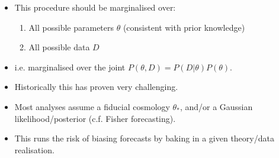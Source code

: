 \documentclass[aspectratio=169]{beamer}
\begin{document}
\begin{frame}
\begin{columns}[t]
        \begin{itemize}
            \item This procedure should be marginalised over:
                \begin{enumerate}
                    \item All possible parameters $\theta$ (consistent with prior knowledge)
                    \item All possible data $D$
                \end{enumerate}
            \item i.e. marginalised over the joint $P(\theta,D)=P(D|\theta)P(\theta)$.
            \item Historically this has proven very challenging.
            \item Most analyses assume a fiducial cosmology $\theta_*$, and/or a Gaussian likelihood/posterior (c.f. Fisher forecasting).
            \item This runs the risk of biasing forecasts by baking in a given theory/data realisation.
        \end{itemize}

    \end{columns}

\end{frame}
\end{document}
